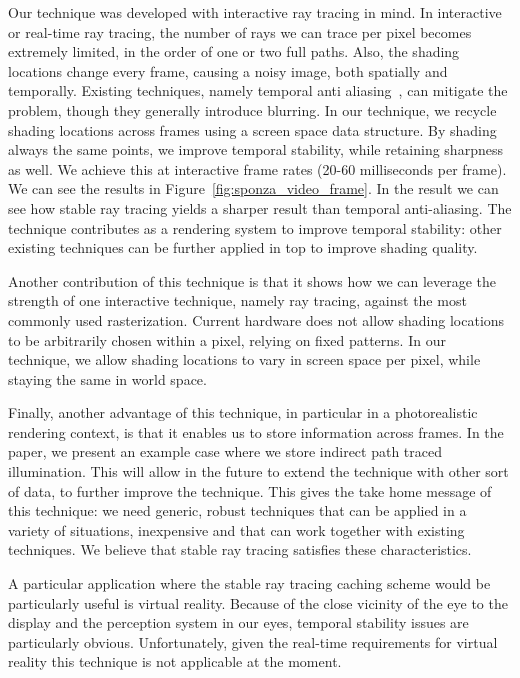 \vspace{1em}
Our technique was developed with interactive ray tracing in mind. In interactive or real-time ray tracing, the number of rays we can trace per pixel becomes extremely limited, in the order of one or two full paths. Also, the shading locations change every frame, causing a noisy image, both spatially and temporally. Existing techniques, namely temporal anti aliasing~\cite{Karis2014}, can mitigate the problem, though they generally introduce blurring. In our technique, we recycle shading locations across frames using a screen space data structure. By shading always the same points, we improve temporal stability, while retaining sharpness as well. We achieve this at interactive frame rates (20-60 milliseconds per frame). We can see the results in Figure~\ref{fig:sponza_video_frame}. In the result we can see how stable ray tracing yields a sharper result than temporal anti-aliasing. The technique contributes as a rendering system to improve temporal stability: other existing techniques can be further applied in top to improve shading quality. 

Another contribution of this technique is that it shows how we can leverage the strength of one interactive technique, namely ray tracing, against the most commonly used rasterization. Current hardware does not allow shading locations to be arbitrarily chosen within a pixel, relying on fixed patterns. In our technique, we allow shading locations to vary in screen space per pixel, while staying the same in world space.

Finally, another advantage of this technique, in particular in a photorealistic rendering context, is that it enables us to store information across frames. In the paper, we present an example case where we store indirect path traced illumination. This will allow in the future to extend the technique with other sort of data, to further improve the technique. This gives the take home message of this technique: we need generic, robust techniques that can be applied in a variety of situations, inexpensive and that can work together with existing techniques. We believe that stable ray tracing satisfies these characteristics. 

A particular application where the stable ray tracing caching scheme would be particularly useful is virtual reality. Because of the close vicinity of the eye to the display and the perception system in our eyes, temporal stability issues are particularly obvious. Unfortunately, given the real-time requirements for virtual reality this technique is not applicable at the moment.

